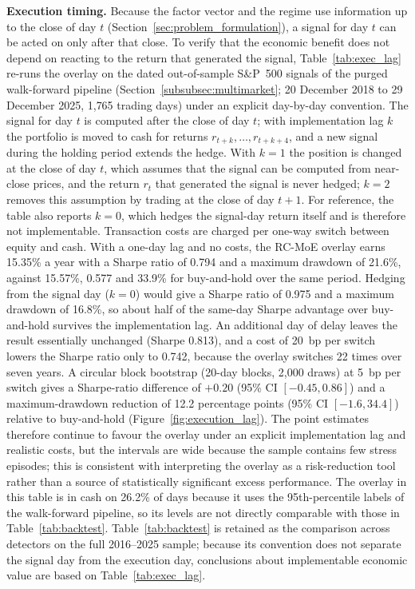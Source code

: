 \documentclass[]{interact}
\newcommand{\rev}[1]{#1}
\begin{document}
\textbf{Execution timing.} Because the factor vector and the regime use information up to the close of day $t$ (Section~\ref{sec:problem_formulation}), a signal for day $t$ can be acted on only after that close. To verify that the economic benefit does not depend on reacting to the return that generated the signal, Table~\ref{tab:exec_lag} re-runs the overlay on the dated out-of-sample S\&P~500 signals of the purged walk-forward pipeline (Section~\ref{subsubsec:multimarket}; 20 December 2018 to 29 December 2025, 1{,}765 trading days) under an explicit day-by-day convention. The signal for day $t$ is computed after the close of day $t$; with implementation lag $k$ the portfolio is moved to cash for returns $r_{t+k},\ldots,r_{t+k+4}$, and a new signal during the holding period extends the hedge. With $k=1$ the position is changed at the close of day $t$, which assumes that the signal can be computed from near-close prices, and the return $r_t$ that generated the signal is never hedged; $k=2$ removes this assumption by trading at the close of day $t+1$. For reference, the table also reports $k=0$, which hedges the signal-day return itself and is therefore not implementable. Transaction costs are charged per one-way switch between equity and cash. With a one-day lag and no costs, the RC-MoE overlay earns 15.35\% a year with a Sharpe ratio of 0.794 and a maximum drawdown of 21.6\%, against 15.57\%, 0.577 and 33.9\% for buy-and-hold over the same period. Hedging from the signal day ($k=0$) would give a Sharpe ratio of 0.975 and a maximum drawdown of 16.8\%, so about half of the same-day Sharpe advantage over buy-and-hold survives the implementation lag. An additional day of delay leaves the result essentially unchanged (Sharpe 0.813), and a cost of 20~bp per switch lowers the Sharpe ratio only to 0.742, because the overlay switches 22 times over seven years. A circular block bootstrap (20-day blocks, 2{,}000 draws) at 5~bp per switch gives a Sharpe-ratio difference of $+0.20$ (95\% CI $[-0.45, 0.86]$) and a maximum-drawdown reduction of 12.2 percentage points (95\% CI $[-1.6, 34.4]$) relative to buy-and-hold\rev{ (Figure~\ref{fig:execution_lag})}. The point estimates therefore continue to favour the overlay under an explicit implementation lag and realistic costs, but the intervals are wide because the sample contains few stress episodes; this is consistent with interpreting the overlay as a risk-reduction tool rather than a source of statistically significant excess performance. The overlay in this table is in cash on 26.2\% of days because it uses the 95th-percentile labels of the walk-forward pipeline, so its levels are not directly comparable with those in Table~\ref{tab:backtest}. Table~\ref{tab:backtest} is retained as the comparison across detectors on the full 2016--2025 sample; because its convention does not separate the signal day from the execution day, conclusions about implementable economic value are based on Table~\ref{tab:exec_lag}.
\end{document}
